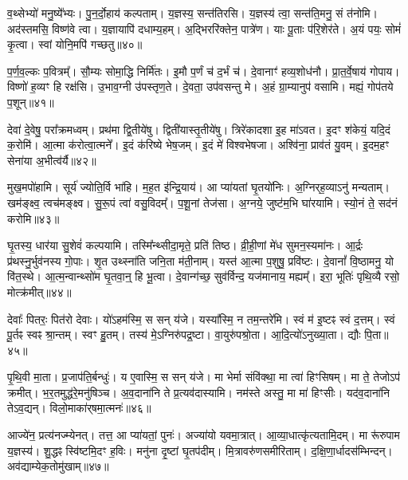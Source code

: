 व॒थ्सेभ्यो॑ मनु॒ष्ये᳚भ्यः।
पु॒न॒र्दो॒हाय॑ कल्पताम्।
य॒ज्ञस्य॒ सन्त॑\-ति\-रसि।
य॒ज्ञस्य॑ त्वा॒ सन्त॑\-ति॒\-मनु॒ सं त॑नोमि।
अद॑स्तमसि॒ विष्ण॑वे त्वा।
य॒ज्ञायापि॑ दधाम्य॒हम्।
अ॒द्भिररि॑क्तेन॒ पात्रे॑ण।
याः पू॒ताः प॑रि॒शेर॑ते।
अ॒यं पयः॒ सोमं॑ कृ॒त्वा।
स्वां योनि॒मपि॑ गच्छतु॥४०॥

प॒र्ण॒व॒ल्कः प॒वित्रम्᳚।
सौ॒म्यः सोमा॒द्धि निर्मि॑तः।
इ॒मौ प॒र्णं च॑ द॒र्भं च॑।
दे॒वानाꣳ॑ हव्य॒शोध॑नौ।
प्रा॒त॒र्वे॒षाय॑ गोपाय।
विष्णो॑ ह॒व्यꣳ हि रक्ष॑सि।
उ॒भाव॒ग्नी उ॑पस्तृण॒ते।
दे॒वता॒ उप॑वसन्तु मे।
अ॒हं ग्रा॒म्यानुप॑ वसामि।
मह्यं॒ गोप॑तये प॒शून्॥४१॥\anuvakamend[आभृ॑त इ॒मं गृ॑ह्णामि॒ पूर्व॒स्ताः पूर्वः॒ परि॑गृह्णामि सभापा॒ला इन्द्र॑ज्येष्ठेभ्य॒ आदि॑त्य व्रतपते सुस॒म्भृता॑ मे स॒ह पु॑नातु गहि नो वि॒श्वरू॑पा दधातु॒ पुन॑र्गच्छतु प॒शून् (याः पु॒रस्ता॑दि॒मामूर्ज॑मि॒ह प्र॒जा इ॒ह प॒शवो॒ऽयं पि॑तृ॒णाम॒ग्निः।)]

देवा॑ दे॒वेषु॒ परा᳚क्रमध्वम्।
प्रथ॑मा द्वि॒तीये॑षु।
द्विती॑यास्तृ॒तीये॑षु।
त्रिरे॑कादशा इ॒ह मा॑ऽवत।
इ॒दꣳ श॑केयं॒ यदि॒दं क॒रोमि॑।
आ॒त्मा क॑रोत्वा॒त्मने᳚।
इ॒दं क॑रिष्ये भेष॒जम्।
इ॒दं मे॑ विश्वभेषजा।
अश्वि॑ना॒ प्राव॑तं यु॒वम्।
इ॒दम॒हꣳ सेना॑या अ॒भीत्व॑र्यै॥४२॥

मुख॒मपो॑हामि।
सूर्य॑ ज्योति॒र्वि भा॑हि।
म॒ह॒त इ॑न्द्रि॒याय॑।
आ प्या॑यतां घृ॒तयो॑निः।
अ॒ग्निर्‌\mbox{}ह॒व्याऽनु॑ मन्यताम्।
खम॑ङ्क्ष्व॒ त्वच॑मङ्क्ष्व।
सु॒रू॒पं त्वा॑ वसु॒विदम्᳚।
प॒शू॒नां तेज॑सा।
अ॒ग्नये॒ जुष्ट॑म॒भि घा॑रयामि।
स्यो॒नं ते॒ सद॑नं करोमि॥४३॥

घृ॒तस्य॒ धार॑या सु॒शेवं॑ कल्पयामि।
तस्मि᳚न्थ्सीदा॒मृते॒ प्रति॑ तिष्ठ।
व्री॒ही॒णां मे॑ध सुमन॒स्यमा॑नः।
आ॒र्द्रः प्र॑थस्नु॒र्भुव॑नस्य गो॒पाः।
शृ॒त उथ्स्ना॑ति जनि॒ता म॑ती॒नाम्।
यस्त॑ आ॒त्मा प॒शुषु॒ प्रवि॑ष्टः।
दे॒वानां᳚ वि॒ष्ठामनु॒ यो वि॑त॒स्थे।
आ॒त्म॒न्वान्थ्सो॑म घृ॒तवा॒न्॒ हि भू॒त्वा।
दे॒वान्ग॑च्छ॒ सुव॑र्विन्द॒ यज॑मानाय॒ मह्यम्᳚।
इरा॒ भूतिः॑ पृथि॒व्यै रसो॒ मोत्क्र॑मीत्॥४४॥

देवाः᳚ पितरः॒ पित॑रो देवाः।
यो॑ऽहम॑स्मि॒ स सन् य॑जे।
यस्या᳚स्मि॒ न तम॒न्तरे॑मि।
स्वं म॑ इ॒ष्टꣴ स्वं द॒त्तम्।
स्वं पू॒र्तꣴ स्वꣴ श्रा॒न्तम्।
स्वꣳ हु॒तम्।
तस्य॑ मे॒\-ऽग्निरु॑पद्र॒ष्टा।
वा॒युरु॑पश्रो॒ता।
आ॒दि॒त्यो॑\-ऽनुख्या॒ता।
द्यौः पि॒ता॥४५॥

पृ॒थि॒वी मा॒ता।
प्र॒जा\-प॑ति॒र्बन्धुः॑।
य ए॒वास्मि॒ स सन् य॑जे।
मा भेर्मा संवि॑क्था॒ मा त्वा॑ हिꣳसिषम्।
मा ते॒ तेजोऽप॑ क्रमीत्।
भ॒र॒तमुद्ध॑रे॒मनु॑षिञ्च।
अ॒व॒दाना॑नि ते प्र॒त्यव॑दास्यामि।
नम॑स्ते अस्तु॒ मा मा॑ हिꣳसीः।
यद॑व॒दाना॑नि तेऽव॒द्यन्।
विलो॒माका॑र्‌\mbox{}षमा॒त्मनः॑॥४६॥

आज्ये॑न॒ प्रत्य॑नज्म्येनत्।
तत्त॒ आ प्या॑यतां॒ पुनः॑।
अज्या॑यो यवमा॒त्रात्।
आ॒व्या॒धात्कृ॑त्यतामि॒दम्।
मा रू॑रुपाम य॒ज्ञस्य॑।
शु॒द्धꣴ स्वि॑ष्टमि॒दꣳ ह॒विः।
मनु॑ना दृ॒ष्टां घृ॒तप॑दीम्।
मि॒त्रावरु॑णसमीरिताम्।
द॒क्षि॒णा॒र्धादस॑म्भिन्दन्।
अव॑द्याम्ये\-क॒तोमु॑खाम्॥४७॥

